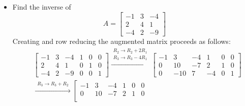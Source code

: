 \documentclass{article}
\begin{document}
\begin{itemize}
\begin{align*}
\begin{array}{ccc|ccc}
0 & 1 & 0 & 13 & -5 & -3 \\ 
0 & 0 & 1 & 5 & -2 & -1  
\end{array}\right]
\xrightarrow{\begin{array}{c} R_1 \rightarrow R_1 - 2R_2 \end{array}} 
\left[\begin{array}{ccc|ccc}
1 & 0 & 0 & -40 & 16 & 9 \\   
0 & 1 & 0 & 13 & -5 & -3 \\ 
0 & 0 & 1 & 5 & -2 & -1  
\end{array}\right]
\end{align*}
Therefore \(A\) is non-singular and has the inverse matrix: 
\[A^{-1} = \begin{bmatrix}
-40 & 16 & 9 \\
13 & -5 & -3 \\
5 & -2 & -1
\end{bmatrix}\]
\item Find the inverse of 
\[A = \begin{bmatrix}
-1 & 3 & -4 \\
2 & 4 & 1 \\
-4 & 2 & -9 
\end{bmatrix}\]
Creating and row reducing the augmented matrix proceeds as follows:
\begin{align*}
& \left[\begin{array}{ccc|ccc}
-1 & 3 & -4 & 1 & 0 & 0 \\   
2 & 4 & 1 & 0 & 1 & 0 \\ 
-4 & 2 & -9 & 0 & 0 & 1  
\end{array}\right]
\xrightarrow{\begin{array}{c} R_2 \rightarrow R_2 + 2R_1 \\ R_3 \rightarrow R_3 - 4R_1 \end{array}} 
\left[\begin{array}{ccc|ccc}
-1 & 3 & -4 & 1 & 0 & 0 \\   
0 & 10 & -7 & 2 & 1 & 0 \\ 
0 & -10 & 7 & -4 & 0 & 1  
\end{array}\right] \\
& \xrightarrow{\begin{array}{c} R_3 \rightarrow R_3 + R_2 \end{array}} 
\left[\begin{array}{ccc|ccc}
-1 & 3 & -4 & 1 & 0 & 0 \\   
0 & 10 & -7 & 2 & 1 & 0 \\ 

\end{array}
\end{align*}
\end{itemize}
\end{document}
